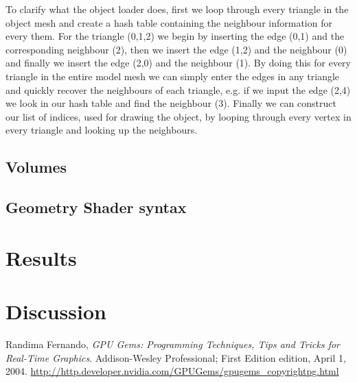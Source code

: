 \documentclass[a4paper, 12pt]{article}
\begin{document}
To clarify what the object loader does, first we loop through every triangle in
the object mesh and create a hash table containing the neighbour information for
every them. For the triangle (0,1,2) we begin by inserting the edge (0,1) and
the corresponding neighbour (2), then we insert the edge (1,2) and the
neighbour (0) and finally we insert the edge (2,0) and the neighbour (1). By
doing this for every triangle in the entire model mesh we can simply enter the
edges in any triangle and quickly recover the neighbours of each triangle, e.g.
if we input the edge (2,4) we look in our hash table and find the neighbour
(3). Finally we can construct our list of indices, used for drawing the object,
by looping through every vertex in every triangle and looking up the neighbours.

\subsection{Volumes}
\subsection{Geometry Shader syntax}
\section{Results}
\section{Discussion }


\begin{thebibliography}{9}
	Randima Fernando,
	\emph{GPU Gems: Programming Techniques, Tips and Tricks for Real-Time
	Graphics}.
	Addison-Wesley Professional; First Edition edition, April 1, 2004.
	\url{http://http.developer.nvidia.com/GPUGems/gpugems\_copyrightpg.html}
\end{thebibliography}
\end{document}
